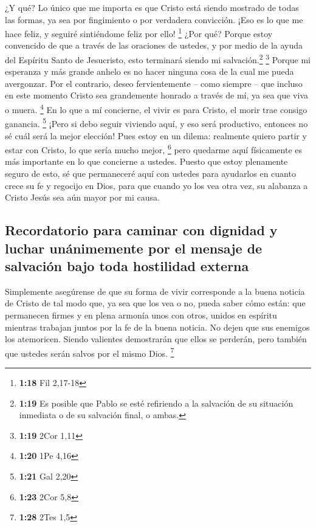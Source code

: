  ¿Y qué? Lo único que me importa es que Cristo está
siendo mostrado de todas las formas, ya sea por fingimiento o por
verdadera convicción. ¡Eso es lo que me hace feliz, y seguiré
sintiéndome feliz por ello! \footnote{\textbf{1:18} Fil 2,17-18}
 ¿Por qué? Porque estoy convencido de que a través de las
oraciones de ustedes, y por medio de la ayuda del Espíritu Santo de
Jesucristo, esto terminará siendo mi salvación.\footnote{\textbf{1:19}
  Es posible que Pablo se esté refiriendo a la salvación de su situación
  inmediata o de su salvación final, o ambas.} \footnote{\textbf{1:19}
  2Cor 1,11}  Porque mi esperanza y más grande anhelo es
no hacer ninguna cosa de la cual me pueda avergonzar. Por el contrario,
deseo fervientemente -- como siempre -- que incluso en este momento
Cristo sea grandemente honrado a través de mí, ya sea que viva o muera.
\footnote{\textbf{1:20} 1Pe 4,16}  En lo que a mí
concierne, el vivir es para Cristo, el morir trae consigo ganancia.
\footnote{\textbf{1:21} Gal 2,20}  ¡Pero si debo seguir
viviendo aquí, y eso será productivo, entonces no sé cuál será la mejor
elección!  Pues estoy en un dilema: realmente quiero
partir y estar con Cristo, lo que sería mucho mejor, \footnote{\textbf{1:23}
  2Cor 5,8}  pero quedarme aquí físicamente es más
importante en lo que concierne a ustedes.  Puesto que
estoy plenamente seguro de esto, sé que permaneceré aquí con ustedes
para ayudarlos en cuanto crece su fe y regocijo en Dios, 
para que cuando yo los vea otra vez, su alabanza a Cristo Jesús sea aún
mayor por mi causa.

\hypertarget{recordatorio-para-caminar-con-dignidad-y-luchar-unuxe1nimemente-por-el-mensaje-de-salvaciuxf3n-bajo-toda-hostilidad-externa}{%
\subsection{Recordatorio para caminar con dignidad y luchar unánimemente
por el mensaje de salvación bajo toda hostilidad
externa}\label{recordatorio-para-caminar-con-dignidad-y-luchar-unuxe1nimemente-por-el-mensaje-de-salvaciuxf3n-bajo-toda-hostilidad-externa}}

 Simplemente asegúrense de que su forma de vivir
corresponde a la buena noticia de Cristo de tal modo que, ya sea que los
vea o no, pueda saber cómo están: que permanecen firmes y en plena
armonía unos con otros, unidos en espíritu mientras trabajan juntos por
la fe de la buena noticia.  No dejen que sus enemigos los
atemoricen. Siendo valientes demostrarán que ellos se perderán, pero
también que ustedes serán salvos por el mismo Dios. \footnote{\textbf{1:28}
  2Tes 1,5}

